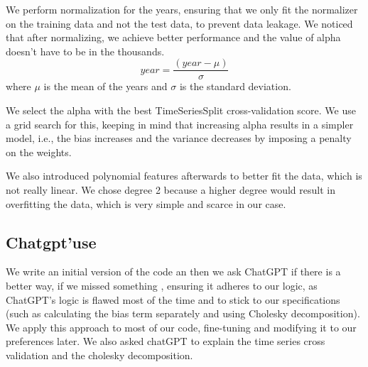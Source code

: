 \documentclass[
]{article}
\begin{document}
We perform normalization for the years, ensuring that we only fit the
normalizer on the training data and not the test data, to prevent data
leakage. We noticed that after normalizing, we achieve better
performance and the value of alpha doesn't have to be in the thousands.
\[year=\frac{(year-\mu)}{\sigma}\] where \(\mu\) is the mean of the
years and \(\sigma\) is the standard deviation.

We select the alpha with the best TimeSeriesSplit cross-validation
score. We use a grid search for this, keeping in mind that increasing
alpha results in a simpler model, i.e., the bias increases and the
variance decreases by imposing a penalty on the weights.

We also introduced polynomial features afterwards to better fit the
data, which is not really linear. We chose degree 2 because a higher
degree would result in overfitting the data, which is very simple and
scarce in our case.

\subsection{Chatgpt'use}\label{chatgptuse}

We write an initial version of the code an then we ask ChatGPT if there
is a better way, if we missed something , ensuring it adheres to our
logic, as ChatGPT's logic is flawed most of the time and to stick to our
specifications (such as calculating the bias term separately and using
Cholesky decomposition). We apply this approach to most of our code,
fine-tuning and modifying it to our preferences later. We also asked
chatGPT to explain the time series cross validation and the cholesky
decomposition.
\end{document}
